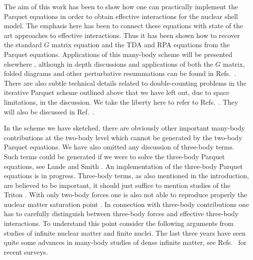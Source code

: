 The aim of this work has been to show how one can practically
implement the Parquet equations in order to obtain effective
interactions for the nuclear shell model. The emphasis here has been
to connect these equations with state of the art approaches to
effective interactions. Thus it has been shown how to recover the
standard $G$ matrix equation and the TDA and RPA equations from the
Parquet equations. Applications of this many-body
scheme will be presented elsewhere \cite{Morten:mhj99}, although in
depth discussions and applications of both the $G$ matrix, folded
diagrams and other perturbative resummations can be found in
Refs.~.  There are also subtle
technical details related to double-counting problems in the
iterative Parquet scheme outlined  above that we have left out, due to space
limitations, in the discussion. We take the liberty here to refer to
Refs.~. They will also be
discussed in Ref.~.


In the scheme we have sketched, there are obviously other important
many-body contributions at the two-body level
which cannot be generated by the two-body Parquet equations.
We have also omitted any discussion of three-body terms.
Such terms could be generated if
we were to solve the three-body Parquet equations, see Lande and
Smith \cite{Morten:jls82}.
An implementation of the three-body Parquet equations is in progress.
Three-body terms, as also mentioned in the introduction, are believed
to be important, it should just  suffice
to mention studies of the Triton \cite{Morten:nogga97}. 
With only two-body forces  one is also not able
to reproduce properly the nuclear matter saturation point
\cite{Morten:apr98}. 
In connection with three-body contributions one has to carefully
distinguish between three-body forces and effective three-body
interactions. To understand this point consider the following
arguments from studies of infinite nuclear matter and finite nuclei.
The last three years have seen quite some advances in many-body
studies of dense infinite matter, see
Refs.~ for recent
surveys.

